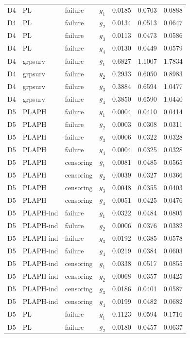 \begin{longtable}{clllrrr}
D4 & PL & failure & $g_{1}$ & 0.0185 & 0.0703 & 0.0888 \\
D4 & PL & failure & $g_{2}$ & 0.0134 & 0.0513 & 0.0647 \\
D4 & PL & failure & $g_{3}$ & 0.0113 & 0.0473 & 0.0586 \\
D4 & PL & failure & $g_{4}$ & 0.0130 & 0.0449 & 0.0579 \\
D4 & grpsurv & failure & $g_{1}$ & 0.6827 & 1.1007 & 1.7834 \\
D4 & grpsurv & failure & $g_{2}$ & 0.2933 & 0.6050 & 0.8983 \\
D4 & grpsurv & failure & $g_{3}$ & 0.3884 & 0.6594 & 1.0477 \\
D4 & grpsurv & failure & $g_{4}$ & 0.3850 & 0.6590 & 1.0440 \\
D5 & PLAPH & failure & $g_{1}$ & 0.0004 & 0.0410 & 0.0414 \\
D5 & PLAPH & failure & $g_{2}$ & 0.0003 & 0.0308 & 0.0311 \\
D5 & PLAPH & failure & $g_{3}$ & 0.0006 & 0.0322 & 0.0328 \\
D5 & PLAPH & failure & $g_{4}$ & 0.0004 & 0.0325 & 0.0328 \\
D5 & PLAPH & censoring & $g_{1}$ & 0.0081 & 0.0485 & 0.0565 \\
D5 & PLAPH & censoring & $g_{2}$ & 0.0039 & 0.0327 & 0.0366 \\
D5 & PLAPH & censoring & $g_{3}$ & 0.0048 & 0.0355 & 0.0403 \\
D5 & PLAPH & censoring & $g_{4}$ & 0.0051 & 0.0425 & 0.0476 \\
D5 & PLAPH-ind & failure & $g_{1}$ & 0.0322 & 0.0484 & 0.0805 \\
D5 & PLAPH-ind & failure & $g_{2}$ & 0.0006 & 0.0376 & 0.0382 \\
D5 & PLAPH-ind & failure & $g_{3}$ & 0.0192 & 0.0385 & 0.0578 \\
D5 & PLAPH-ind & failure & $g_{4}$ & 0.0219 & 0.0384 & 0.0603 \\
D5 & PLAPH-ind & censoring & $g_{1}$ & 0.0338 & 0.0517 & 0.0855 \\
D5 & PLAPH-ind & censoring & $g_{2}$ & 0.0068 & 0.0357 & 0.0425 \\
D5 & PLAPH-ind & censoring & $g_{3}$ & 0.0186 & 0.0401 & 0.0587 \\
D5 & PLAPH-ind & censoring & $g_{4}$ & 0.0199 & 0.0482 & 0.0682 \\
D5 & PL & failure & $g_{1}$ & 0.1123 & 0.0594 & 0.1716 \\
D5 & PL & failure & $g_{2}$ & 0.0180 & 0.0457 & 0.0637 \\

\end{longtable}
